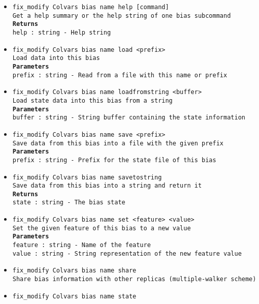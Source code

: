 \begin{itemize}
\item \texttt{fix\_modify Colvars bias name help [command]}
\\
\texttt{Get a help summary or the help string of one bias subcommand}
\\
\texttt{\textbf{Returns}}
\\
\texttt{help : string - Help string}
\item \texttt{fix\_modify Colvars bias name load <prefix>}
\\
\texttt{Load data into this bias}
\\
\texttt{\textbf{Parameters}}
\\
\texttt{prefix : string - Read from a file with this name or prefix}
\item \texttt{fix\_modify Colvars bias name loadfromstring <buffer>}
\\
\texttt{Load state data into this bias from a string}
\\
\texttt{\textbf{Parameters}}
\\
\texttt{buffer : string - String buffer containing the state information}
\item \texttt{fix\_modify Colvars bias name save <prefix>}
\\
\texttt{Save data from this bias into a file with the given prefix}
\\
\texttt{\textbf{Parameters}}
\\
\texttt{prefix : string - Prefix for the state file of this bias}
\item \texttt{fix\_modify Colvars bias name savetostring}
\\
\texttt{Save data from this bias into a string and return it}
\\
\texttt{\textbf{Returns}}
\\
\texttt{state : string - The bias state}
\item \texttt{fix\_modify Colvars bias name set <feature> <value>}
\\
\texttt{Set the given feature of this bias to a new value}
\\
\texttt{\textbf{Parameters}}
\\
\texttt{feature : string - Name of the feature}
\\
\texttt{value : string - String representation of the new feature value}
\item \texttt{fix\_modify Colvars bias name share}
\\
\texttt{Share bias information with other replicas (multiple-walker scheme)}
\item \texttt{fix\_modify Colvars bias name state}

\end{itemize}
